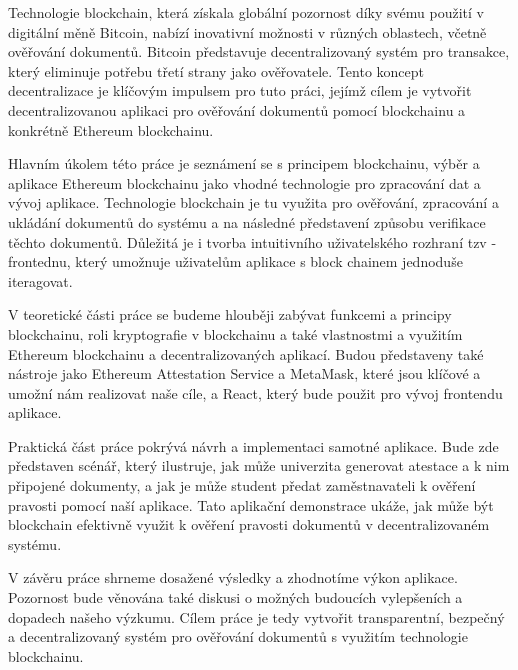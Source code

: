 
Technologie blockchain, která získala globální pozornost díky svému použití v digitální měně Bitcoin, nabízí inovativní možnosti v různých oblastech, včetně ověřování dokumentů. Bitcoin představuje decentralizovaný systém pro transakce, který eliminuje potřebu třetí strany jako ověřovatele. Tento koncept decentralizace je klíčovým impulsem pro tuto práci, jejímž cílem je vytvořit decentralizovanou aplikaci pro ověřování dokumentů pomocí blockchainu a konkrétně Ethereum blockchainu.

Hlavním úkolem této práce je seznámení se s principem blockchainu, výběr a aplikace Ethereum blockchainu jako vhodné technologie pro zpracování dat a vývoj aplikace. Technologie blockchain je tu využita pro ověřování, zpracování a ukládání dokumentů do systému a na následné představení způsobu verifikace těchto dokumentů. Důležitá je i tvorba intuitivního uživatelského rozhraní tzv - frontednu, který umožnuje uživatelům aplikace s block chainem jednoduše iteragovat.

V teoretické části práce se budeme hlouběji zabývat funkcemi a principy blockchainu, roli kryptografie v blockchainu a také vlastnostmi a využitím Ethereum blockchainu a decentralizovaných aplikací. Budou představeny také nástroje jako Ethereum Attestation Service a MetaMask, které jsou klíčové a umožní nám realizovat naše cíle, a React, který bude použit pro vývoj frontendu aplikace.

Praktická část práce pokrývá návrh a implementaci samotné aplikace. Bude zde představen scénář, který ilustruje, jak může univerzita generovat atestace a k nim připojené dokumenty, a jak je může student předat zaměstnavateli k ověření pravosti pomocí naší aplikace. Tato aplikační demonstrace ukáže, jak může být blockchain efektivně využit k ověření pravosti dokumentů v decentralizovaném systému.

V závěru práce shrneme dosažené výsledky a zhodnotíme výkon aplikace. Pozornost bude věnována také diskusi o možných budoucích vylepšeních a dopadech našeho výzkumu. Cílem práce je tedy vytvořit transparentní, bezpečný a decentralizovaný systém pro ověřování dokumentů s využitím technologie blockchainu.



